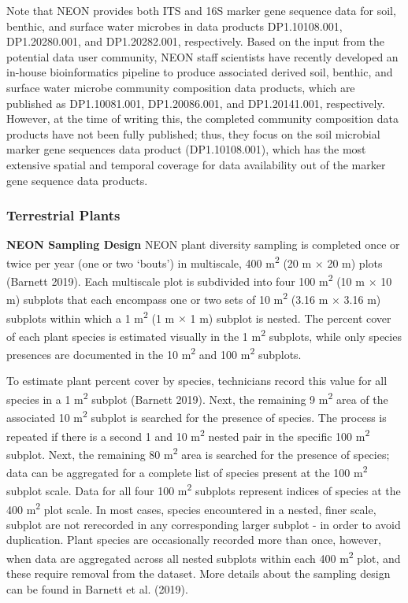 \documentclass[
  12pt,
]{article}
\begin{document}
Note that NEON provides both ITS and 16S marker gene sequence data for soil, benthic, and surface water microbes in data products DP1.10108.001, DP1.20280.001, and DP1.20282.001, respectively. Based on the input from the potential data user community, NEON staff scientists have recently developed an in-house bioinformatics pipeline to produce associated derived soil, benthic, and surface water microbe community composition data products, which are published as DP1.10081.001, DP1.20086.001, and DP1.20141.001, respectively. However, at the time of writing this, the completed community composition data products have not been fully published; thus, they focus on the soil microbial marker gene sequences data product (DP1.10108.001), which has the most extensive spatial and temporal coverage for data availability out of the marker gene sequence data products.

\hypertarget{terrestrial-plants}{%
\subsubsection{Terrestrial Plants}\label{terrestrial-plants}}

\textbf{NEON Sampling Design} NEON plant diversity sampling is completed once or twice per year (one or two `bouts') in multiscale, 400 m\textsuperscript{2} (20 m \(\times\) 20 m) plots (Barnett 2019). Each multiscale plot is subdivided into four 100 m\textsuperscript{2} (10 m \(\times\) 10 m) subplots that each encompass one or two sets of 10 m\textsuperscript{2} (3.16 m \(\times\) 3.16 m) subplots within which a 1 m\textsuperscript{2} (1 m \(\times\) 1 m) subplot is nested. The percent cover of each plant species is estimated visually in the 1 m\textsuperscript{2} subplots, while only species presences are documented in the 10 m\textsuperscript{2} and 100 m\textsuperscript{2} subplots.

To estimate plant percent cover by species, technicians record this value for all species in a 1 m\textsuperscript{2} subplot (Barnett 2019). Next, the remaining 9 m\textsuperscript{2} area of the associated 10 m\textsuperscript{2} subplot is searched for the presence of species. The process is repeated if there is a second 1 and 10 m\textsuperscript{2} nested pair in the specific 100 m\textsuperscript{2} subplot. Next, the remaining 80 m\textsuperscript{2} area is searched for the presence of species; data can be aggregated for a complete list of species present at the 100 m\textsuperscript{2} subplot scale. Data for all four 100 m\textsuperscript{2} subplots represent indices of species at the 400 m\textsuperscript{2} plot scale. In most cases, species encountered in a nested, finer scale, subplot are not rerecorded in any corresponding larger subplot - in order to avoid duplication. Plant species are occasionally recorded more than once, however, when data are aggregated across all nested subplots within each 400 m\textsuperscript{2} plot, and these require removal from the dataset. More details about the sampling design can be found in Barnett et al. (2019).
\end{document}
